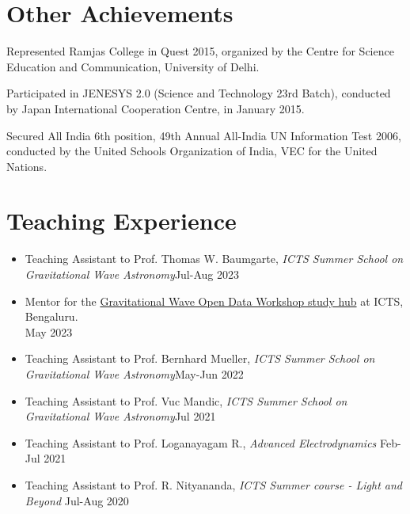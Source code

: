 \documentclass[margin,line]{res}
\begin{document}
\begin{resume}
\section{\sc Other Achievements}
\begin{itemize}[noitemsep]
{
\item Represented Ramjas College in Quest 2015, organized by the Centre for Science Education and Communication, University of Delhi.
\item Participated in JENESYS 2.0 (Science and Technology 23rd Batch), conducted by Japan International Cooperation Centre, in January 2015.
\item Secured All India 6th position, 49th Annual All-India UN Information Test 2006, conducted by the United Schools Organization of India, VEC for the United Nations.
}\end{itemize}

\section{\sc Teaching Experience}
\begin{itemize}[noitemsep]
\item Teaching Assistant to Prof. Thomas W. Baumgarte, \textit{ICTS Summer School on Gravitational Wave Astronomy}\hfill{Jul-Aug 2023}
\item Mentor for the \href{https://www.icts.res.in/discussion-meeting/gwodw2023}{Gravitational Wave Open Data Workshop study hub} at ICTS, Bengaluru.\\ \hfill{May 2023}
\item Teaching Assistant to Prof. Bernhard Mueller, \textit{ICTS Summer School on Gravitational Wave Astronomy}\hfill{May-Jun 2022}
\item Teaching Assistant to Prof. Vuc Mandic, \textit{ICTS Summer School on Gravitational Wave Astronomy}\hfill{Jul 2021}
\item Teaching Assistant to Prof. Loganayagam R., \textit{Advanced Electrodynamics} \hfill{Feb-Jul 2021}
\item Teaching Assistant to Prof. R. Nityananda, \textit{ICTS Summer course - Light and Beyond} \hfill{Jul-Aug 2020} 
\end{itemize}


\end{resume}
\end{document}
